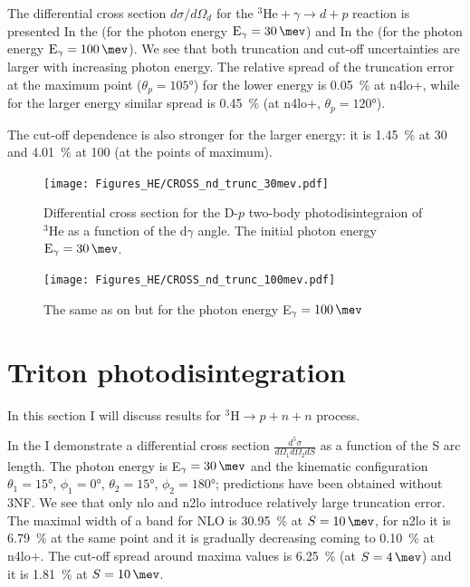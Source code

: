     The differential cross section $d\sigma/d\Omega_d$ for the $^3\text{He} + \gamma \rightarrow d + p$ reaction
    is presented In the  (for the photon energy $\text{E}_\gamma = \SI{30}{\mev}$)
    and In the  (for the photon energy $\text{E}_\gamma = \SI{100}{\mev}$).
    We see that both truncation and cut-off uncertainties are larger with increasing photon energy.
    The relative spread of the truncation error at the maximum point ($\theta_p = \ang{105}$)
    for the lower energy is \SI{0.05}{\percent} at \gls{n4lo+}, while for the larger energy
    similar spread is \SI{0.45}{\percent} (at \gls{n4lo+}, $\theta_p = \ang{120}$).

    The cut-off dependence is also stronger for the larger energy:
    it is  \SI{1.45}{\percent} at \SI{30}{\mev} and \SI{4.01}{\percent} at \SI{100}{\mev}
    (at the points of maximum). 

\begin{figure}[h]
    \begin{center}
        \texttt{[image: Figures\_HE/CROSS\_nd\_trunc\_30mev.pdf]}
        \end{center}
        \caption{Differential cross section for the D-$p$ 
        two-body photodisintegraion of $^3$He as a function of the d$\gamma$ angle.
        The initial photon energy $\text{E}_\gamma=\SI{30}{\mev}$.}
        \label{CROSS_nd_30}
    \end{figure}


    \begin{figure}[h]
        \begin{center}
        \texttt{[image: Figures\_HE/CROSS\_nd\_trunc\_100mev.pdf]}
        \end{center}
        \caption{The same as on  but 
        for the photon energy E$_\gamma=\SI{100}{\mev}$}
        \label{CROSS_nd_100}
    \end{figure}

    \clearpage
\section{Triton photodisintegration}
    \label{sec:triton_results}
    
    
    In this section I will discuss results
    for $^3\text{H} \rightarrow p + n + n$ process.

    In the  I demonstrate a differential cross section 
    $\frac{d^5\sigma}{d\Omega_1d\Omega_2dS}$ as a function of the S arc length.
    The photon energy is  E$_\gamma=\SI{30}{\mev}$ and the kinematic configuration
    $\theta_1 = \ang{15}$, $\phi_1 = \ang{0}$,
    $\theta_2 = \ang{15}$, $\phi_2 = \ang{180}$; predictions have been obtained without 3NF.
    We see that only \gls{nlo} and \gls{n2lo} introduce relatively large truncation error.
    The maximal width of a band for NLO is \SI{30.95}{\percent} at $S=\SI{10}{\mev}$,
    for \gls{n2lo} it is \SI{6.79}{\percent} at the same point and it is gradually decreasing
    coming to \SI{0.10}{\percent} at \gls{n4lo+}.
    The cut-off spread around maxima values is \SI{6.25}{\percent} (at $S=\SI{4}{\mev}$) and it is
    \SI{1.81}{\percent} at $S=\SI{10}{\mev}$.

